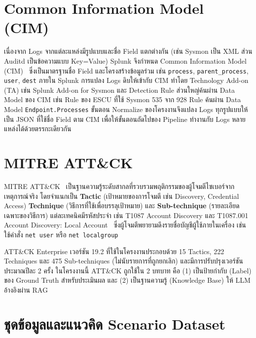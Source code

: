 \section{Common Information Model (CIM)}
เนื่องจาก Logs จากแต่ละแหล่งมีรูปแบบและชื่อ Field แตกต่างกัน
(เช่น Sysmon เป็น XML ส่วน Auditd เป็นข้อความแบบ Key=Value)
Splunk จึงกำหนด Common Information Model (CIM)~\cite{splunk-cim}
ซึ่งเป็นมาตรฐานชื่อ Field และโครงสร้างข้อมูลร่วม เช่น \texttt{process}, \texttt{parent\_process}, \texttt{user}, \texttt{dest}
ภายใน Splunk การแปลง Logs ดิบให้เข้ากับ CIM ทำโดย Technology Add-on (TA) เช่น Splunk Add-on for Sysmon
และ Detection Rule ส่วนใหญ่ค้นผ่าน Data Model ของ CIM เช่น Rule ของ ESCU ที่ใช้ Sysmon 535 จาก 928 Rule
ค้นผ่าน Data Model \texttt{Endpoint.Processes}
ขั้นตอน Normalize ของโครงงานจึงแปลง Logs ทุกรูปแบบให้เป็น JSON ที่ใช้ชื่อ Field ตาม CIM
เพื่อให้ขั้นตอนถัดไปของ Pipeline ทำงานกับ Logs หลายแหล่งได้ด้วยตรรกะเดียวกัน

\section{MITRE ATT\&CK}
MITRE ATT\&CK~\cite{mitre-attack,strom2018attack} เป็นฐานความรู้ระดับสากลที่รวบรวมพฤติกรรมของผู้โจมตีไซเบอร์จากเหตุการณ์จริง
โดยจำแนกเป็น \textbf{Tactic} (เป้าหมายของการโจมตี เช่น Discovery, Credential Access)
\textbf{Technique} (วิธีการที่ใช้เพื่อบรรลุเป้าหมาย) และ \textbf{Sub-technique} (รายละเอียดเฉพาะของวิธีการ)
แต่ละเทคนิคมีรหัสประจำ เช่น T1087 Account Discovery และ T1087.001 Account Discovery: Local Account~\cite{mitre-t1087-001}
ซึ่งผู้โจมตีพยายามดึงรายชื่อบัญชีผู้ใช้ภายในเครื่อง เช่น ใช้คำสั่ง \texttt{net user} หรือ \texttt{net localgroup}

ATT\&CK Enterprise เวอร์ชัน 19.2 ที่ใช้ในโครงงานประกอบด้วย 15 Tactics, 222 Techniques
และ 475 Sub-techniques (ไม่นับรายการที่ถูกยกเลิก) และมีการปรับปรุงเวอร์ชันประมาณปีละ 2 ครั้ง
ในโครงงานนี้ ATT\&CK ถูกใช้ใน 2 บทบาท คือ (1) เป็นป้ายกำกับ (Label) ของ Ground Truth สำหรับประเมินผล
และ (2) เป็นฐานความรู้ (Knowledge Base) ให้ LLM อ้างอิงผ่าน RAG

\section{ชุดข้อมูลและแนวคิด Scenario Dataset}

